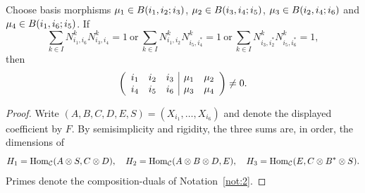 \documentclass{amsart}
\begin{document}
\begin{lemma}\label{Lem: one-dim}
Choose basis morphisms $\mu_1 \in B(i_1,i_2;i_3)$, $\mu_2 \in B(i_3,i_4;i_5)$, $\mu_3 \in B(i_2,i_4;i_6)$ and $\mu_4 \in B(i_1,i_6;i_5)$. If
$$
\sum_{k\in I} N_{i_1,i_6}^{k} N_{i_3,i_4}^{k} = 1
~\text{or}~
\sum_{k \in I} N_{i_1,i_2}^{k} N_{i_5,i_4^*}^{k} =1
~\text{or}~
\sum_{k\in I} N_{i_3,i_2^*}^{k} N_{i_5,i_6^*}^{k} = 1,
$$
then
$$
\left(
\begin{array}{ccc | cc}
i_1& i_2 & i_3 & \mu_1 & \mu_2 \\
i_4& i_5 & i_6 & \mu_3 & \mu_4
\end{array}
\right) \neq 0.
$$
\end{lemma}
\begin{proof}
Write $(A,B,C,D,E,S)=(X_{i_1},\ldots,X_{i_6})$ and denote the displayed coefficient by $F$. By semisimplicity and rigidity, the three sums are, in order, the dimensions of
\[
 H_1=\mathrm{Hom}_{\mathcal{C}}(A\otimes S,C\otimes D),\quad H_2=\mathrm{Hom}_{\mathcal{C}}(A\otimes B\otimes D,E),\quad H_3=\mathrm{Hom}_{\mathcal{C}}(E,C\otimes B^*\otimes S).
\]
Primes denote the composition-duals of Notation~\ref{not:2}.


\end{proof}
\end{document}
